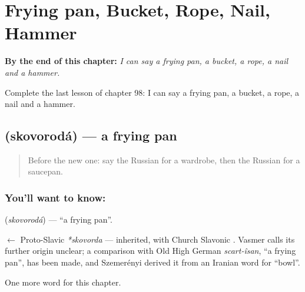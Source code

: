 
\chapter{Frying pan, Bucket, Rope, Nail, Hammer}
\label{ch:ru-frying-pan-bucket-rope-nail-hammer}

\begin{chapteropening}
\textbf{By the end of this chapter:} \emph{I can say a frying pan, a bucket, a rope, a nail and a hammer.}

Complete the last lesson of chapter 98: I can say a frying pan, a bucket, a rope, a nail and a hammer.
\end{chapteropening}

\section[\texorpdfstring{\ru{сковорода} (skovorodá)}{сковорода (skovorodá)}]{ (skovorodá) — a frying pan}

\label{lesson:RU-C98-frying-pan}



\begin{quote}
Before the new one: say the Russian for a wardrobe, then the Russian for a saucepan.
\end{quote}

\subsection*{You'll want to know: }
\textbf{} (\emph{skovorodá}) — \textquotedblleft{}a frying pan\textquotedblright{}.

\begin{cousinweb}
\textbf{} $\leftarrow$ Proto-Slavic \emph{*skovorda} — inherited, with Church Slavonic \emph{}. Vasmer calls its further origin unclear; a comparison with Old High German \emph{scart-îsan}, \textquotedblleft{}a frying pan\textquotedblright{}, has been made, and Szemerényi derived it from an Iranian word for \textquotedblleft{}bowl\textquotedblright{}.
\end{cousinweb}

\begin{grammarlens}[title={What you've built}]
One more word for this chapter.
\end{grammarlens}

